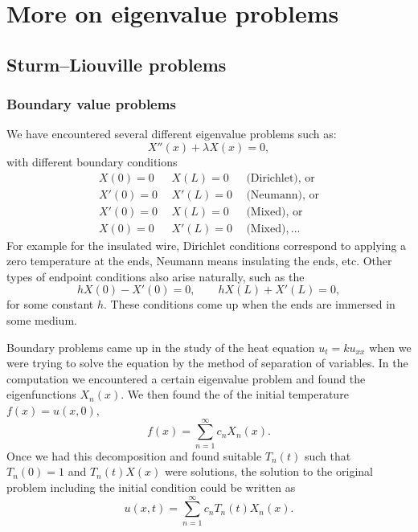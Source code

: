 \chapter{More on eigenvalue problems} \label{SL:chapter}


\section{Sturm--Liouville problems}
\label{slproblems:section}


\subsection{Boundary value problems}

We have encountered several different eigenvalue problems such as:
\begin{equation*}
X''(x) + \lambda X(x) = 0 ,
\end{equation*}
with different boundary
conditions%
%
\begin{equation*}
\begin{array}{rrl}
X(0) = 0 & ~~X(L) = 0 & ~~\text{(Dirichlet), or} \\
X'(0) = 0 & ~~X'(L) = 0 & ~~\text{(Neumann), or} \\
X'(0) = 0 & ~~X(L) = 0 & ~~\text{(Mixed), or} \\
X(0) = 0 & ~~X'(L) = 0 & ~~\text{(Mixed)}, \ldots
\end{array}
\end{equation*}
For example for the insulated wire,
Dirichlet conditions correspond to applying a
zero temperature at the ends, Neumann means insulating the ends, etc.
Other types of endpoint conditions also arise naturally, such as
the \emph{}
\begin{equation*}
hX(0) - X'(0) = 0, \qquad hX(L) + X'(L) = 0 ,
\end{equation*}
for some constant $h$.  These conditions come up when the ends are immersed
in some medium.

Boundary problems came up in the study of the heat equation $u_t =
k u_{xx}$ when we were trying to solve the equation by the method of
separation of
variables.  In the computation
we encountered a certain eigenvalue problem and found the
eigenfunctions
$X_n(x)$.  We then found the \emph{} of
the initial
temperature $f(x) = u(x,0)$,
\begin{equation*}
f(x) = \sum_{n=1}^\infty c_n X_n(x) .
\end{equation*}
Once we had this decomposition
and found suitable $T_n(t)$ such that $T_n(0) = 1$
and $T_n(t)X(x)$ were solutions,
the solution to the original problem including the initial
condition could be written as
\begin{equation*}
u(x,t) = \sum_{n=1}^\infty c_n T_n(t) X_n(x) .
\end{equation*}

